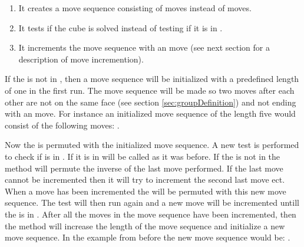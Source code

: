 \begin{enumerate}
	\item It creates a move sequence consisting of  moves instead of  moves.
	\item It tests if the cube is solved instead of testing if it is in .
	\item It increments the move sequence with an  move (see next section for a description of move incremention).
\end{enumerate} 

If the \rubik{} is not in , then a move sequence will be initialized with a predefined length of one in the first run.
The move sequence will be made so two moves after each other are not on the same face (see section \ref{sec:groupDefinition}) and not ending with an  move.
For instance an initialized move sequence of the length five would consist of the following moves: .

Now the \rubik{} is permuted with the initialized move sequence.
A new test is performed to check if \rubik{} is in .
If it is in   will be called as it was before.
If the \rubik{} is not in  the method will permute the inverse of the last move performed.
If the last move cannot be incremented then it will try to increment the second last move ect.
When a move has been incremented the \rubik{} will be permuted with this new move sequence.
The test will then run again and a new move will be incremented untill the \rubik{} is in .
After all the moves in the move sequence have been incremented, then the method will increase the length of the move sequence and initialize a new move sequence.
In the example from before the new move sequence would be: .


